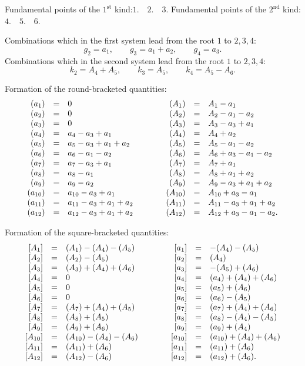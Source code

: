 \documentclass[10pt]{article}
\begin{document}
\noindent Fundamental points of the \(1^{\mathrm{st}}\) kind:\quad \(1.\quad2.\quad3.\)
\hfill Fundamental points of the \(2^{\mathrm{nd}}\) kind:\quad \(4.\quad5.\quad6.\)

\noindent Combinations which in the first system lead from the root \(1\) to \(2,3,4\):
\[
g_2=a_1,\qquad g_3=a_1+a_2,\qquad g_4=a_3.
\]
Combinations which in the second system lead from the root \(1\) to \(2,3,4\):
\[
k_2=A_4+A_5,\qquad k_3=A_5,\qquad k_4=A_5-A_6.
\]

\noindent Formation of the round-bracketed quantities:
\[
\begin{array}{rcl@{\qquad\qquad}rcl}
(a_1)&=&0&(A_1)&=&A_1-a_1\\
(a_2)&=&0&(A_2)&=&A_2-a_1-a_2\\
(a_3)&=&0&(A_3)&=&A_3-a_3+a_1\\
(a_4)&=&a_4-a_3+a_1&(A_4)&=&A_4+a_2\\
(a_5)&=&a_5-a_3+a_1+a_2&(A_5)&=&A_5-a_1-a_2\\
(a_6)&=&a_6-a_1-a_2&(A_6)&=&A_6+a_3-a_1-a_2\\
(a_7)&=&a_7-a_3+a_1&(A_7)&=&A_7+a_1\\
(a_8)&=&a_8-a_1&(A_8)&=&A_8+a_1+a_2\\
(a_9)&=&a_9-a_2&(A_9)&=&A_9-a_3+a_1+a_2\\
(a_{10})&=&a_{10}-a_3+a_1&(A_{10})&=&A_{10}+a_3-a_1\\
(a_{11})&=&a_{11}-a_3+a_1+a_2&(A_{11})&=&A_{11}-a_3+a_1+a_2\\
(a_{12})&=&a_{12}-a_3+a_1+a_2&(A_{12})&=&A_{12}+a_3-a_1-a_2.
\end{array}
\]

\noindent Formation of the square-bracketed quantities:
\[
\begin{array}{rcl@{\qquad\qquad}rcl}
{}[A_1]&=&(A_1)-(A_4)-(A_5)&[a_1]&=&-(A_4)-(A_5)\\
{}[A_2]&=&(A_2)-(A_5)&[a_2]&=&(A_4)\\
{}[A_3]&=&(A_3)+(A_4)+(A_6)&[a_3]&=&-(A_5)+(A_6)\\
{}[A_4]&=&0&[a_4]&=&(a_4)+(A_4)+(A_6)\\
{}[A_5]&=&0&[a_5]&=&(a_5)+(A_6)\\
{}[A_6]&=&0&[a_6]&=&(a_6)-(A_5)\\
{}[A_7]&=&(A_7)+(A_4)+(A_5)&[a_7]&=&(a_7)+(A_4)+(A_6)\\
{}[A_8]&=&(A_8)+(A_5)&[a_8]&=&(a_8)-(A_4)-(A_5)\\
{}[A_9]&=&(A_9)+(A_6)&[a_9]&=&(a_9)+(A_4)\\
{}[A_{10}]&=&(A_{10})-(A_4)-(A_6)&[a_{10}]&=&(a_{10})+(A_4)+(A_6)\\
{}[A_{11}]&=&(A_{11})+(A_6)&[a_{11}]&=&(a_{11})+(A_6)\\
{}[A_{12}]&=&(A_{12})-(A_6)&[a_{12}]&=&(a_{12})+(A_6).
\end{array}
\]
\end{document}
